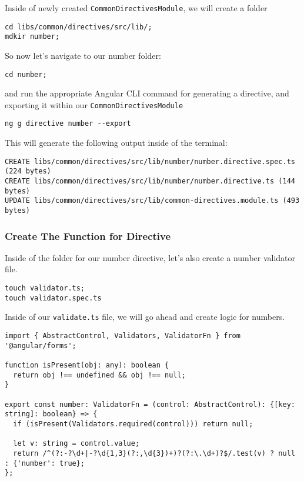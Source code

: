 Inside of newly created \lstinline{CommonDirectivesModule}, we will create 
a folder 
\begin{verbatim}
cd libs/common/directives/src/lib/;
mdkir number; 
\end{verbatim}

So now let's navigate to our number folder:
\begin{verbatim} 
cd number;  
\end{verbatim}  

and run the appropriate Angular CLI command for generating a directive, and exporting it within our \lstinline{CommonDirectivesModule}

\begin{verbatim}
ng g directive number --export  
\end{verbatim}

This will generate the following output inside of the terminal: 
\begin{verbatim}
CREATE libs/common/directives/src/lib/number/number.directive.spec.ts (224 bytes)
CREATE libs/common/directives/src/lib/number/number.directive.ts (144 bytes)
UPDATE libs/common/directives/src/lib/common-directives.module.ts (493 bytes)
\end{verbatim}

\subsubsection{Create The Function for Directive}
Inside of the folder for our number directive, let's also create a number validator file.

\begin{verbatim}
touch validator.ts;
touch validator.spec.ts
\end{verbatim}

Inside of our \lstinline{validate.ts} file, we will go ahead and create logic for numbers.

\begin{lstlisting}[caption=number-validator.ts]
import { AbstractControl, Validators, ValidatorFn } from '@angular/forms';

function isPresent(obj: any): boolean {
  return obj !== undefined && obj !== null;
}

export const number: ValidatorFn = (control: AbstractControl): {[key: string]: boolean} => {
  if (isPresent(Validators.required(control))) return null;

  let v: string = control.value;
  return /^(?:-?\d+|-?\d{1,3}(?:,\d{3})+)?(?:\.\d+)?$/.test(v) ? null : {'number': true};
}; 
\end{lstlisting}

